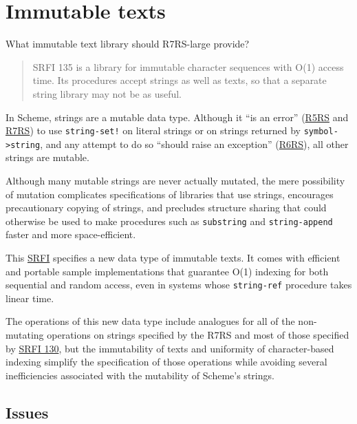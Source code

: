 \section{Immutable texts}
 What immutable text library should R7RS-large provide?

\begin{quote}
SRFI 135 is a library for immutable character sequences with O(1) access
time. Its procedures accept strings as well as texts, so that a separate
string library may not be as useful.
\end{quote}


In Scheme, strings are a mutable data type. Although it ``is an error''
(\protect\hyperlink{R5RS}{R5RS} and \protect\hyperlink{R7RS}{R7RS}) to
use \texttt{string-set!} on literal strings or on strings returned by
\texttt{symbol-\textgreater{}string}, and any attempt to do so ``should
raise an exception'' (\protect\hyperlink{R6RS}{R6RS}), all other strings
are mutable.

Although many mutable strings are never actually mutated, the mere
possibility of mutation complicates specifications of libraries that use
strings, encourages precautionary copying of strings, and precludes
structure sharing that could otherwise be used to make procedures such
as \texttt{substring} and \texttt{string-append} faster and more
space-efficient.

This \protect\hyperlink{SRFI}{SRFI} specifies a new data type of
immutable texts. It comes with efficient and portable sample
implementations that guarantee O(1) indexing for both sequential and
random access, even in systems whose \texttt{string-ref} procedure takes
linear time.

The operations of this new data type include analogues for all of the
non-mutating operations on strings specified by the R7RS and most of
those specified by \protect\hyperlink{SRFI-130}{SRFI 130}, but the
immutability of texts and uniformity of character-based indexing
simplify the specification of those operations while avoiding several
inefficiencies associated with the mutability of Scheme's strings.

\subsection{{Issues}}\label{issues}

